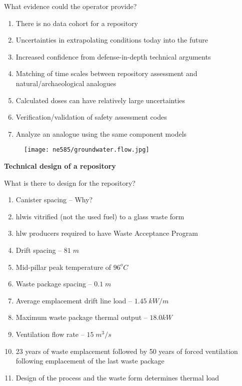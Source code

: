\documentclass[aspectratio=1610,pdftex,dvipsnames,compress,xcolor={dvipsnames}]{beamer}
\newcommand{\acs}{\acrshort} %
\begin{document}
\begin{frame}{What evidence could the operator provide?}
    \begin{enumerate}[series=outerlist,topsep=0pt,itemsep=21pt,leftmargin=*,label=(\arabic*)]
        \item[]There is no data cohort for a repository
        \item[]Uncertainties in extrapolating conditions today into the future
        \item[]Increased confidence from defense-in-depth technical arguments
        \item[]Matching of time scales between repository assessment and natural/archaeological analogues
        \item[]Calculated doses can have relatively large uncertainties
        \item[]Verification/validation of safety assessment codes 
        \item[]Analyze an analogue using the same component models
    \end{enumerate}
\end{frame}


\begin{frame}{}
    \begin{figure}
        \centering
        \texttt{[image: ne585/groundwater.flow.jpg]}
    \end{figure}
\end{frame}


\begin{frame}[plain]{}
    \centering\Large\textbf{Technical design of a repository}
\end{frame}


\addtocounter{framenumber}{-1} 
\begin{frame}{What is there to design for the repository?}
    \begin{enumerate}[series=outerlist,topsep=0pt,itemsep=7pt,leftmargin=*,label=(\arabic*)]
        \item[]Canister spacing -- Why?
        \item[]\acs{hlw}is vitrified (not the used fuel) to a glass waste form
        \item[]\acs{hlw} producers required to have Waste Acceptance Program 
        \item[]Drift spacing -- $81 \; m$
        \item[]Mid-pillar peak temperature of $96^oC$
        \item[]Waste package spacing -- $0.1 \; m$
        \item[]Average emplacement drift line load -- $1.45 \; kW/m$
        \item[]Maximum waste package thermal output -- $18.0 kW$
        \item[]Ventilation flow rate -- $15 \; m^3/s$
        \item[]23 years of waste emplacement followed by 50 years of forced ventilation following emplacement of the last waste package
        \item[]Design of the process and the waste form determines thermal load
    \end{enumerate}
\end{frame}
\end{document}
